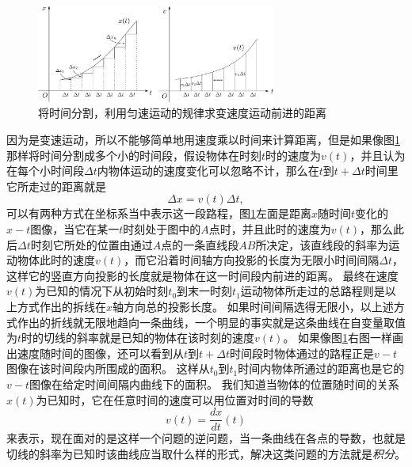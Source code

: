 \begin{figure}[hbtp]
\centering
\includegraphics[width=0.7\textwidth]{images/cal-13.pdf}
\caption{将时间分割，利用匀速运动的规律求变速度运动前进的距离}\label{fig: 微积分-积分的离散形式}
\end{figure}

因为是变速运动，所以不能够简单地用速度乘以时间来计算距离，但是如果像图\ref{fig: 微积分-积分的离散形式}那样将时间分割成多个小的时间段，假设物体在时刻$t$时的速度为$v(t)$，并且认为在每个小时间段$\Delta t$内物体运动的速度变化可以忽略不计，那么在$t$到$t+\Delta t$时间里它所走过的距离就是
\begin{equation}
\Delta x = v(t)\Delta t,
\end{equation}
可以有两种方式在坐标系当中表示这一段路程，图\ref{fig: 微积分-积分的离散形式}左面是距离$x$随时间$t$变化的$x-t$图像，当它在某一$t$时刻处于图中的$A$点时，并且此时的速度为$v(t)$，那么此后$\Delta t$时刻它所处的位置由通过$A$点的一条直线段$AB$所决定，该直线段的斜率为运动物体此时的速度$v(t)$，而它沿着时间轴方向投影的长度为无限小时间间隔$\Delta t$，这样它的竖直方向投影的长度就是物体在这一时间段内前进的距离。
最终在速度$v(t)$为已知的情况下从初始时刻$t_0$到末一时刻$t_1$运动物体所走过的总路程则是以上方式作出的拆线在$x$轴方向总的投影长度。
如果时间间隔选得无限小，以上述方式作出的折线就无限地趋向一条曲线，一个明显的事实就是这条曲线在自变量取值为$t$时的切线的斜率就是已知的物体在该时刻的速度$v(t)$。
如果像图\ref{fig: 微积分-积分的离散形式}右图一样画出速度随时间的图像，还可以看到从$t$到$t+\Delta t$时间段时物体通过的路程正是$v-t$图像在该时间段内所围成的面积。
这样从$t_0$到$t_1$时间内物体所通过的距离也是它的$v-t$图像在给定时间间隔内曲线下的面积。
我们知道当物体的位置随时间的关系$x(t)$为已知时，它在任意时间的速度可以用位置对时间的导数
\begin{equation}
v(t)=\frac{dx}{dt}(t)
\end{equation}
来表示，现在面对的是这样一个问题的逆问题，当一条曲线在各点的导数，也就是切线的斜率为已知时该曲线应当取什么样的形式，解决这类问题的方法就是\emph{积分}。

